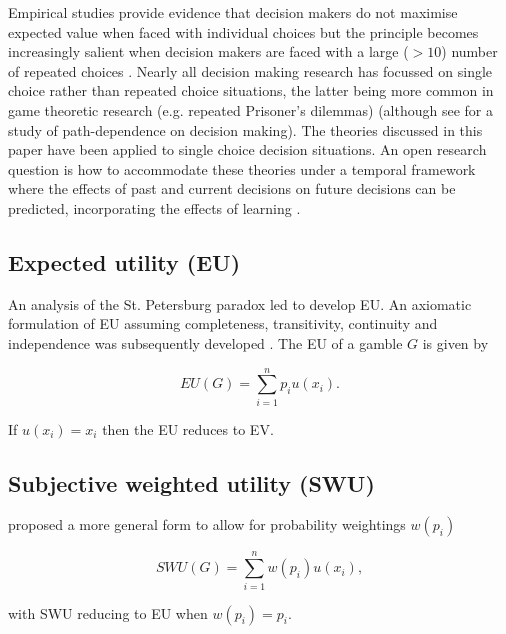 \documentclass{article}\usepackage[]{graphicx}\usepackage[]{color}
\begin{document}
Empirical studies provide evidence that decision makers do not maximise expected value when faced with individual choices but the principle becomes increasingly salient when decision makers are faced with a large ($> 10$) \citep*{Montgomery_Adelbratt_1982} number of repeated choices \citep*{Lichtenstein_Slovic_Zink_1969, Li_2003, Colbert_Murray_Nieschwietz_2009}. Nearly all decision making research has focussed on single choice rather than repeated choice situations, the latter being more common in game theoretic research (e.g. repeated Prisoner's dilemmas) (although see \citealp[][]{Post_van_den_Assem_Baltussen_Thaler_2008} for a study of path-dependence on decision making). The theories discussed in this paper have been applied to single choice decision situations. An open research question is how to accommodate these theories under a temporal framework where the effects of past and current decisions on future decisions can be predicted, incorporating the effects of learning \cite[see Problem 6][p. 665]{Hastie_2001}.

\subsection{Expected utility (EU)}


An analysis of the St. Petersburg paradox led \cite{Bernoulli_1738_1954} to develop EU.
An axiomatic formulation of EU assuming completeness, transitivity, continuity and independence was subsequently developed \citep[p. 26]{von_Neumann_Morgenstern_1947}. The EU of a gamble $G$ is given by

\begin{equation}
EU(G) = \sum_{i=1}^{n} p_i u(x_i).
\label{eu_equation}
\end{equation}

If $u(x_i) = x_i$ then the EU reduces to EV.

\subsection{Subjective weighted utility (SWU)}

\cite{Edwards_1954, Edwards_1962} proposed a more general form to allow for probability weightings $w(p_i)$

\begin{equation}
SWU(G) = \sum_{i=1}^{n} w(p_i) u(x_i),
\label{swu_equation}
\end{equation}

with SWU reducing to EU when $w(p_i) = p_i$.
\end{document}
